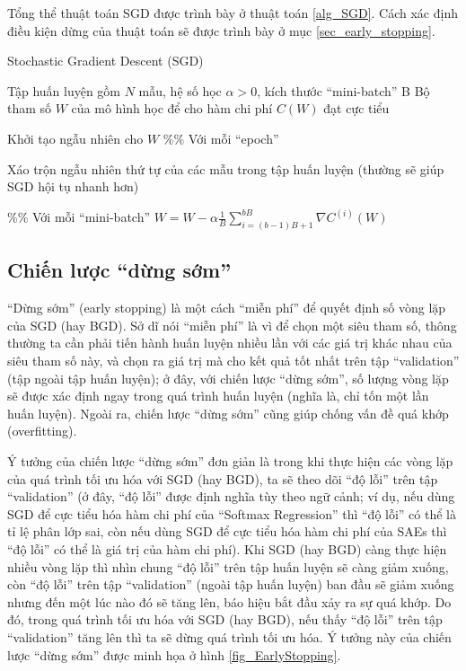 Tổng thể thuật toán SGD được trình bày ở thuật toán \ref{alg_SGD}. Cách xác định điều kiện dừng của thuật toán sẽ được trình bày ở mục \ref{sec_early_stopping}.
\begin{algorithm}
	\caption{Stochastic Gradient Descent (SGD)}
	\label{alg_SGD}
	\begin{algorithmic}[1]
		\renewcommand{\algorithmicrequire}{\textbf{Đầu vào:}}
		\renewcommand{\algorithmicensure}{\textbf{Đầu ra:}}
		\algnewcommand{}
		\algnewcommand\Operation{\item[\algorithmicoperation]}
		
		\Require Tập huấn luyện gồm $N$ mẫu, hệ số học $\alpha>0$, kích thước ``mini-batch'' B
		\Ensure Bộ tham số $W$ của mô hình học để cho hàm chi phí $C(W)$ đạt cực tiểu
		
		\Operation
		\State Khởi tạo ngẫu nhiên cho $W$
		 \%\% Với mỗi ``epoch''
			\State \parbox[t]{\dimexpr\linewidth-\algorithmicindent}{Xáo trộn ngẫu nhiên thứ tự của các mẫu trong tập huấn luyện (thường sẽ giúp SGD hội tụ nhanh hơn)\strut}
			 \%\% Với mỗi ``mini-batch''
				\State $W = W - \alpha \frac{1}{B} \sum_{i=(b-1)B+1}^{bB} \nabla C^{(i)}(W)$ 
			\EndFor
		\EndWhile
	\end{algorithmic}
\end{algorithm}

\subsection{Chiến lược ``dừng sớm''}{\label{sec_early_stopping}}
``Dừng sớm'' (early stopping) là một cách ``miễn phí'' để quyết định số vòng lặp của SGD (hay BGD). Sở dĩ nói ``miễn phí'' là vì để chọn một siêu tham số, thông thường ta cần phải tiến hành huấn luyện nhiều lần với các giá trị khác nhau của siêu tham số này, và chọn ra giá trị mà cho kết quả tốt nhất trên tập ``validation'' (tập ngoài tập huấn luyện); ở đây, với chiến lược ``dừng sớm'', số lượng vòng lặp sẽ được xác định ngay trong quá trình huấn luyện (nghĩa là, chỉ tốn một lần huấn luyện). Ngoài ra, chiến lược ``dừng sớm'' cũng giúp chống vấn đề quá khớp (overfitting).

Ý tưởng của chiến lược ``dừng sớm'' đơn giản là trong khi thực hiện các vòng lặp của quá trình tối ưu hóa với SGD (hay BGD), ta sẽ theo dõi ``độ lỗi'' trên tập ``validation'' (ở đây, ``độ lỗi'' được định nghĩa tùy theo ngữ cảnh; ví dụ, nếu dùng SGD để cực tiểu hóa hàm chi phí của ``Softmax Regression'' thì ``độ lỗi'' có thể là tỉ lệ phân lớp sai, còn nếu dùng SGD để cực tiểu hóa hàm chi phí của SAEs thì ``độ lỗi'' có thể là giá trị của hàm chi phí). Khi SGD (hay BGD) càng thực hiện nhiều vòng lặp thì nhìn chung ``độ lỗi'' trên tập huấn luyện sẽ càng giảm xuống, còn ``độ lỗi'' trên tập ``validation'' (ngoài tập huấn luyện) ban đầu sẽ giảm xuống nhưng đến một lúc nào đó sẽ tăng lên, báo hiệu bắt đầu xảy ra sự quá khớp. Do đó, trong quá trình tối ưu hóa với SGD (hay BGD), nếu thấy ``độ lỗi'' trên tập ``validation'' tăng lên thì ta sẽ dừng quá trình tối ưu hóa. Ý tưởng này của chiến lược ``dừng sớm'' được minh họa ở hình \ref{fig_EarlyStopping}.

